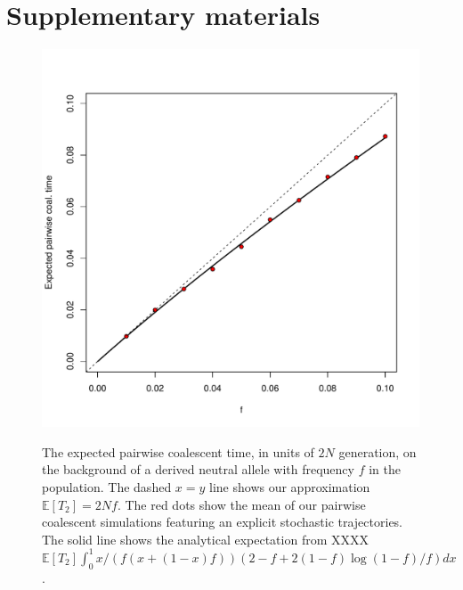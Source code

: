 \documentclass[a4paper,10pt]{article}
\begin{document}
\section{Supplementary materials}

\setcounter{table}{0}
\renewcommand{\thetable}{S\arabic{table}}
\setcounter{figure}{0}
\renewcommand{\thefigure}{S\arabic{figure}}


\begin{figure}
	\includegraphics[width = \textwidth]{../Paper_Figures/n_two_coal_time.pdf} \label{n_2_supp_plot}
\caption{The expected pairwise coalescent time, in units of $2N$ generation, on the background of a derived neutral allele with frequency $f$ in the population.  The dashed $x=y$ line shows our approximation $\mathbb{E}  [T_2]=2Nf$. The red dots show the mean of our pairwise coalescent simulations featuring an explicit stochastic trajectories. The solid line shows the analytical expectation from XXXX  
$\mathbb{E} [T_2] \int_0^1 x/(f (x+(1-x)f))(2-f+2(1-f) \log(1-f)/f) dx $.}
\end{figure}   %
\end{document}
